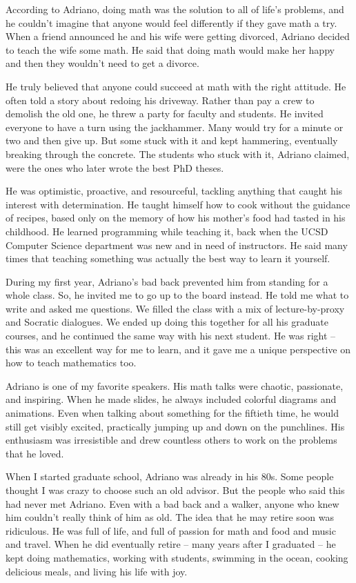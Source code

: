 \documentclass{amsart}
\begin{document}
According to Adriano, doing math was the solution to all of life's problems, and he couldn't imagine that anyone would feel differently if they gave math a try. When a friend announced he and his wife were getting divorced, Adriano decided to teach the wife some math. He said that doing math would make her happy and then they wouldn't need to get a divorce.

He truly believed that anyone could succeed at math with the right attitude. He often told a story about redoing his driveway. Rather than pay a crew to demolish the old one, he threw a party for faculty and students. He invited everyone to have a turn using the jackhammer. Many would try for a minute or two and then give up. But some stuck with it and kept hammering, eventually breaking through the concrete. The students who stuck with it, Adriano claimed, were the ones who later wrote the best PhD theses.

He was optimistic, proactive, and resourceful, tackling anything that caught his interest with determination. He taught himself how to cook without the guidance of recipes, based only on the memory of how his mother’s food had tasted in his childhood. He learned programming while teaching it, back when the UCSD Computer Science department was new and in need of instructors. He said many times that teaching something was actually the best way to learn it yourself.

During my first year, Adriano's bad back prevented him from standing for a whole class. So, he invited me to go up to the board instead. He told me what to write and asked me questions. We filled the class with a mix of lecture-by-proxy and Socratic dialogues. We ended up doing this together for all his graduate courses, and he continued the same way with his next student. He was right – this was an excellent way for me to learn, and it gave me a unique perspective on how to teach mathematics too.

Adriano is one of my favorite speakers. His math talks were chaotic, passionate, and inspiring. When he made slides, he always included colorful diagrams and animations. Even when talking about something for the fiftieth time, he would still get visibly excited, practically jumping up and down on the punchlines. His enthusiasm was irresistible and drew countless others to work on the problems that he loved.

When I started graduate school, Adriano was already in his 80s. Some people thought I was crazy to choose such an old advisor. But the people who said this had never met Adriano. Even with a bad back and a walker, anyone who knew him couldn't really think of him as old. The idea that he may retire soon was ridiculous. He was full of life, and full of passion for math and food and music and travel. When he did eventually retire – many years after I graduated – he kept doing mathematics, working with students, swimming in the ocean, cooking delicious meals, and living his life with joy.
\end{document}
